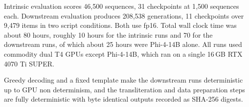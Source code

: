 \documentclass[11pt]{article}
\begin{document}
Intrinsic evaluation scores 46{,}500 sequences, 31 checkpoints at 1{,}500
sequences each. Downstream evaluation produces 208{,}538 generations, 11
checkpoints over 9{,}479 items in two script conditions. Both use fp16. Total
wall clock time was about 80 hours, roughly 10 hours for the intrinsic runs and 70
for the downstream runs, of which about 25 hours were Phi-4-14B alone. All runs
used commodity dual T4 GPUs except Phi-4-14B, which ran on a single 16\,GB
RTX 4070 Ti SUPER.

Greedy decoding and a fixed template make the downstream runs deterministic up to
GPU non determinism, and the transliteration and data preparation steps are fully
deterministic with byte identical outputs recorded as SHA-256 digests.
\end{document}
